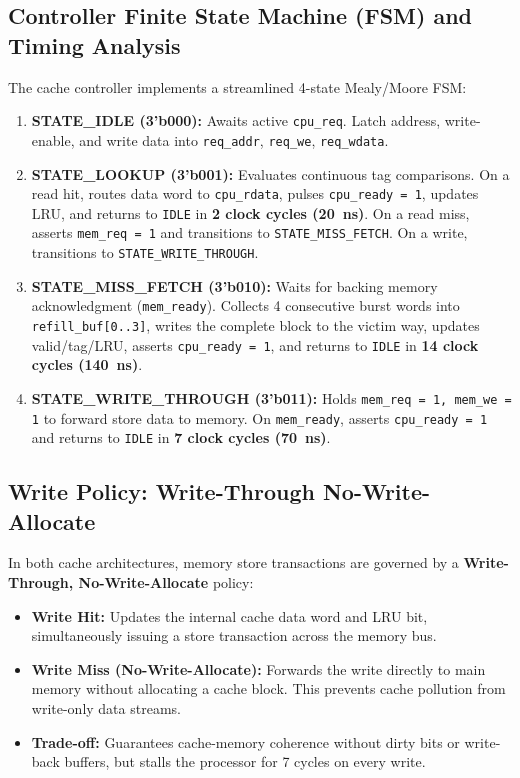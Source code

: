 \documentclass[journal,10pt,twocolumn]{IEEEtran}
\begin{document}
\subsection{Controller Finite State Machine (FSM) and Timing Analysis}
The cache controller implements a streamlined 4-state Mealy/Moore FSM:
\begin{enumerate}
    \item \textbf{STATE\_IDLE (3'b000):} Awaits active \texttt{cpu\_req}. Latch address, write-enable, and write data into \texttt{req\_addr}, \texttt{req\_we}, \texttt{req\_wdata}.
    \item \textbf{STATE\_LOOKUP (3'b001):} Evaluates continuous tag comparisons. On a read hit, routes data word to \texttt{cpu\_rdata}, pulses \texttt{cpu\_ready = 1}, updates LRU, and returns to \texttt{IDLE} in \textbf{2 clock cycles (20~ns)}. On a read miss, asserts \texttt{mem\_req = 1} and transitions to \texttt{STATE\_MISS\_FETCH}. On a write, transitions to \texttt{STATE\_WRITE\_THROUGH}.
    \item \textbf{STATE\_MISS\_FETCH (3'b010):} Waits for backing memory acknowledgment (\texttt{mem\_ready}). Collects 4 consecutive burst words into \texttt{refill\_buf[0..3]}, writes the complete block to the victim way, updates valid/tag/LRU, asserts \texttt{cpu\_ready = 1}, and returns to \texttt{IDLE} in \textbf{14 clock cycles (140~ns)}.
    \item \textbf{STATE\_WRITE\_THROUGH (3'b011):} Holds \texttt{mem\_req = 1, mem\_we = 1} to forward store data to memory. On \texttt{mem\_ready}, asserts \texttt{cpu\_ready = 1} and returns to \texttt{IDLE} in \textbf{7 clock cycles (70~ns)}.
\end{enumerate}

\subsection{Write Policy: Write-Through No-Write-Allocate}
In both cache architectures, memory store transactions are governed by a \textbf{Write-Through, No-Write-Allocate} policy:
\begin{itemize}
    \item \textbf{Write Hit:} Updates the internal cache data word and LRU bit, simultaneously issuing a store transaction across the memory bus.
    \item \textbf{Write Miss (No-Write-Allocate):} Forwards the write directly to main memory without allocating a cache block. This prevents cache pollution from write-only data streams.
    \item \textbf{Trade-off:} Guarantees cache-memory coherence without dirty bits or write-back buffers, but stalls the processor for 7 cycles on every write.
\end{itemize}
\end{document}
